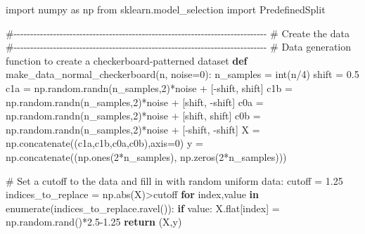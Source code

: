 \documentclass[
  letterpaper,
  DIV=11,
  numbers=noendperiod]{scrartcl}
\newenvironment{Shaded}{\begin{snugshade}}{\end{snugshade}}
\newcommand{\BuiltInTok}[1]{\textcolor[rgb]{0.00,0.23,0.31}{#1}}
\newcommand{\CommentTok}[1]{\textcolor[rgb]{0.37,0.37,0.37}{#1}}
\newcommand{\ControlFlowTok}[1]{\textcolor[rgb]{0.00,0.23,0.31}{\textbf{#1}}}
\newcommand{\DecValTok}[1]{\textcolor[rgb]{0.68,0.00,0.00}{#1}}
\newcommand{\FloatTok}[1]{\textcolor[rgb]{0.68,0.00,0.00}{#1}}
\newcommand{\ImportTok}[1]{\textcolor[rgb]{0.00,0.46,0.62}{#1}}
\newcommand{\KeywordTok}[1]{\textcolor[rgb]{0.00,0.23,0.31}{\textbf{#1}}}
\newcommand{\NormalTok}[1]{\textcolor[rgb]{0.00,0.23,0.31}{#1}}
\newcommand{\OperatorTok}[1]{\textcolor[rgb]{0.37,0.37,0.37}{#1}}
\begin{document}
\begin{Shaded}
\begin{Highlighting}[]
\ImportTok{import}\NormalTok{ numpy }\ImportTok{as}\NormalTok{ np}
\ImportTok{from}\NormalTok{ sklearn.model\_selection }\ImportTok{import}\NormalTok{ PredefinedSplit}

\CommentTok{\#{-}{-}{-}{-}{-}{-}{-}{-}{-}{-}{-}{-}{-}{-}{-}{-}{-}{-}{-}{-}{-}{-}{-}{-}{-}{-}{-}{-}{-}{-}{-}{-}{-}{-}{-}{-}{-}{-}{-}{-}{-}{-}{-}{-}{-}{-}{-}{-}{-}{-}{-}{-}{-}{-}{-}{-}{-}{-}{-}{-}{-}{-}{-}{-}{-}{-}{-}{-}{-}{-}{-}{-}{-}{-}{-}{-}{-}}
\CommentTok{\# Create the data}
\CommentTok{\#{-}{-}{-}{-}{-}{-}{-}{-}{-}{-}{-}{-}{-}{-}{-}{-}{-}{-}{-}{-}{-}{-}{-}{-}{-}{-}{-}{-}{-}{-}{-}{-}{-}{-}{-}{-}{-}{-}{-}{-}{-}{-}{-}{-}{-}{-}{-}{-}{-}{-}{-}{-}{-}{-}{-}{-}{-}{-}{-}{-}{-}{-}{-}{-}{-}{-}{-}{-}{-}{-}{-}{-}{-}{-}{-}{-}{-}}
\CommentTok{\# Data generation function to create a checkerboard{-}patterned dataset}
\KeywordTok{def}\NormalTok{ make\_data\_normal\_checkerboard(n, noise}\OperatorTok{=}\DecValTok{0}\NormalTok{):}
\NormalTok{    n\_samples }\OperatorTok{=} \BuiltInTok{int}\NormalTok{(n}\OperatorTok{/}\DecValTok{4}\NormalTok{)}
\NormalTok{    shift }\OperatorTok{=} \FloatTok{0.5}
\NormalTok{    c1a }\OperatorTok{=}\NormalTok{ np.random.randn(n\_samples,}\DecValTok{2}\NormalTok{)}\OperatorTok{*}\NormalTok{noise }\OperatorTok{+}\NormalTok{ [}\OperatorTok{{-}}\NormalTok{shift, shift]}
\NormalTok{    c1b }\OperatorTok{=}\NormalTok{ np.random.randn(n\_samples,}\DecValTok{2}\NormalTok{)}\OperatorTok{*}\NormalTok{noise }\OperatorTok{+}\NormalTok{ [shift, }\OperatorTok{{-}}\NormalTok{shift]}
\NormalTok{    c0a }\OperatorTok{=}\NormalTok{ np.random.randn(n\_samples,}\DecValTok{2}\NormalTok{)}\OperatorTok{*}\NormalTok{noise }\OperatorTok{+}\NormalTok{ [shift, shift]}
\NormalTok{    c0b }\OperatorTok{=}\NormalTok{ np.random.randn(n\_samples,}\DecValTok{2}\NormalTok{)}\OperatorTok{*}\NormalTok{noise }\OperatorTok{+}\NormalTok{ [}\OperatorTok{{-}}\NormalTok{shift, }\OperatorTok{{-}}\NormalTok{shift]}
\NormalTok{    X }\OperatorTok{=}\NormalTok{ np.concatenate((c1a,c1b,c0a,c0b),axis}\OperatorTok{=}\DecValTok{0}\NormalTok{)}
\NormalTok{    y }\OperatorTok{=}\NormalTok{ np.concatenate((np.ones(}\DecValTok{2}\OperatorTok{*}\NormalTok{n\_samples), np.zeros(}\DecValTok{2}\OperatorTok{*}\NormalTok{n\_samples)))}
    
    \CommentTok{\# Set a cutoff to the data and fill in with random uniform data:}
\NormalTok{    cutoff }\OperatorTok{=} \FloatTok{1.25}
\NormalTok{    indices\_to\_replace }\OperatorTok{=}\NormalTok{ np.}\BuiltInTok{abs}\NormalTok{(X)}\OperatorTok{\textgreater{}}\NormalTok{cutoff}
    \ControlFlowTok{for}\NormalTok{ index,value }\KeywordTok{in} \BuiltInTok{enumerate}\NormalTok{(indices\_to\_replace.ravel()):}
        \ControlFlowTok{if}\NormalTok{ value:}
\NormalTok{            X.flat[index] }\OperatorTok{=}\NormalTok{ np.random.rand()}\OperatorTok{*}\FloatTok{2.5}\OperatorTok{{-}}\FloatTok{1.25}
    \ControlFlowTok{return}\NormalTok{ (X,y)}


\end{Highlighting}
\end{Shaded}
\end{document}
